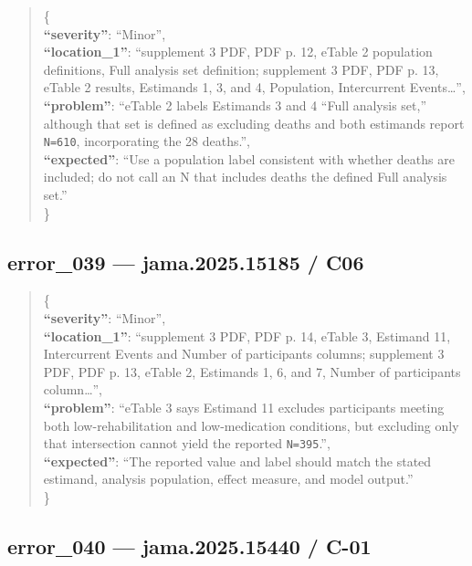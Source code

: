 \documentclass[
  letterpaper,
  9pt]{extreport}
\begin{document}
\begin{quote}
\{\\
\textbf{``severity''}: ``Minor'',\\
\textbf{``location\_1''}: ``supplement 3 PDF, PDF p. 12, eTable 2
population definitions, Full analysis set definition; supplement 3 PDF,
PDF p. 13, eTable 2 results, Estimands 1, 3, and 4, Population,
Intercurrent Events\ldots{}'',\\
\textbf{``problem''}: ``eTable 2 labels Estimands 3 and 4 ``Full
analysis set,'' although that set is defined as excluding deaths and
both estimands report \texttt{N=610}, incorporating the 28 deaths.'',\\
\textbf{``expected''}: ``Use a population label consistent with whether
deaths are included; do not call an N that includes deaths the defined
Full analysis set.''\\
\}
\end{quote}

\hypertarget{error_039--jama202515185--c06}{%
\subsection{error\_039 --- jama.2025.15185 /
C06}\label{error_039--jama202515185--c06}}

\begin{quote}
\{\\
\textbf{``severity''}: ``Minor'',\\
\textbf{``location\_1''}: ``supplement 3 PDF, PDF p. 14, eTable 3,
Estimand 11, Intercurrent Events and Number of participants columns;
supplement 3 PDF, PDF p. 13, eTable 2, Estimands 1, 6, and 7, Number of
participants column\ldots{}'',\\
\textbf{``problem''}: ``eTable 3 says Estimand 11 excludes participants
meeting both low-rehabilitation and low-medication conditions, but
excluding only that intersection cannot yield the reported
\texttt{N=395}.'',\\
\textbf{``expected''}: ``The reported value and label should match the
stated estimand, analysis population, effect measure, and model
output.''\\
\}
\end{quote}

\hypertarget{error_040--jama202515440--c-01}{%
\subsection{error\_040 --- jama.2025.15440 /
C-01}\label{error_040--jama202515440--c-01}}
\end{document}
